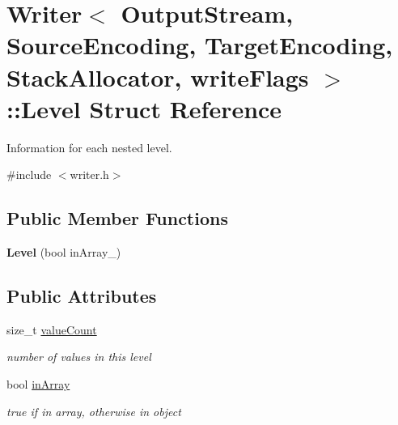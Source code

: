 \hypertarget{structWriter_1_1Level}{}\section{Writer$<$ Output\+Stream, Source\+Encoding, Target\+Encoding, Stack\+Allocator, write\+Flags $>$\+:\+:Level Struct Reference}
\label{structWriter_1_1Level}


Information for each nested level.  




{\ttfamily \#include $<$writer.\+h$>$}

\subsection*{Public Member Functions}
\begin{DoxyCompactItemize}
\item 
{\bfseries Level} (bool in\+Array\+\_\+)\hypertarget{structWriter_1_1Level_a0b1844a7a1b7c6c20e1964dbb67da484}{}\label{structWriter_1_1Level_a0b1844a7a1b7c6c20e1964dbb67da484}

\end{DoxyCompactItemize}
\subsection*{Public Attributes}
\begin{DoxyCompactItemize}
\item 
size\+\_\+t \hyperlink{structWriter_1_1Level_a4a09e5fda49d0d57b2adc041203f244f}{value\+Count}\hypertarget{structWriter_1_1Level_a4a09e5fda49d0d57b2adc041203f244f}{}\label{structWriter_1_1Level_a4a09e5fda49d0d57b2adc041203f244f}

\begin{DoxyCompactList}\small\item\em number of values in this level \end{DoxyCompactList}\item 
bool \hyperlink{structWriter_1_1Level_aa009a2d675e98757c2997072aad78789}{in\+Array}\hypertarget{structWriter_1_1Level_aa009a2d675e98757c2997072aad78789}{}\label{structWriter_1_1Level_aa009a2d675e98757c2997072aad78789}

\begin{DoxyCompactList}\small\item\em true if in array, otherwise in object \end{DoxyCompactList}\end{DoxyCompactItemize}


